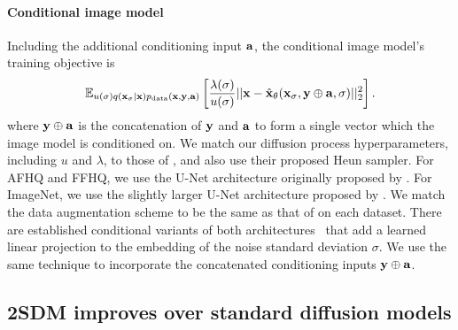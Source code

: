 \paragraph{Conditional image model}
Including the additional conditioning input ${\mathbf{a}}$, the conditional image model's training objective is
\begin{equation}
\label{eq:conditional-image-model-objective}
    \mathbb{E}_{u(\sigma)q({\mathbf{x}}_\sigma|{\mathbf{x}})p_{\rm{data}}({\mathbf{x}},{\mathbf{y}},{\mathbf{a}})} \left[ \frac{\lambda(\sigma)}{u(\sigma)} \lvert\lvert {\mathbf{x}} - \hat{{\mathbf{x}}}_\theta({\mathbf{x}}_\sigma, {\mathbf{y}} \oplus {\mathbf{a}}, \sigma) \rvert\rvert_2^2 \right].
\end{equation}
where ${\mathbf{y}} \oplus {\mathbf{a}}$ is the concatenation of ${\mathbf{y}}$ and ${\mathbf{a}}$ to form a single vector which the image model is conditioned on. We match our diffusion process hyperparameters, including $u$ and $\lambda$, to those of \citet{karras2022elucidating}, and also use their proposed Heun sampler.  For AFHQ and FFHQ, we use the U-Net architecture originally proposed by \citet{song2020score}. For ImageNet, we use the slightly larger U-Net architecture proposed by \citet{dhariwal2021diffusion}. We match the data augmentation scheme to be the same as that of \citet{karras2022elucidating} on each dataset. There are established conditional variants of both architectures~\citep{dhariwal2021diffusion,karras2022elucidating} that add a learned linear projection to the embedding of the noise standard deviation $\sigma$.  We use the same technique to incorporate the concatenated conditioning inputs ${\mathbf{y}}\oplus{\mathbf{a}}$.

\subsection{2SDM improves over standard diffusion models} \label{sec:2sdm-experiments}


